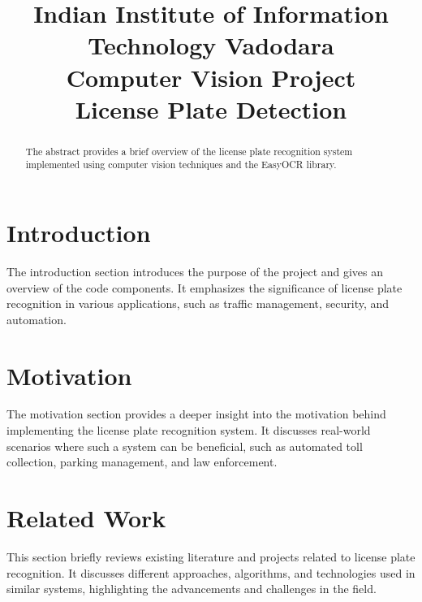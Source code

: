\documentclass[conference]{IEEEtran}
\begin{document}
\title{%
Indian Institute of Information Technology Vadodara\\[1\baselineskip]
Computer Vision Project\\[1\baselineskip]
License Plate Detection
}

\author{
\and
{}
\and
{}
\and
{}
}

\maketitle

\begin{abstract}
The abstract provides a brief overview of the license plate recognition system implemented using computer vision techniques and the EasyOCR library.
\end{abstract}

\section{Introduction}
The introduction section introduces the purpose of the project and gives an overview of the code components. It emphasizes the significance of license plate recognition in various applications, such as traffic management, security, and automation.

\section{Motivation}
The motivation section provides a deeper insight into the motivation behind implementing the license plate recognition system. It discusses real-world scenarios where such a system can be beneficial, such as automated toll collection, parking management, and law enforcement.

\section{Related Work}
This section briefly reviews existing literature and projects related to license plate recognition. It discusses different approaches, algorithms, and technologies used in similar systems, highlighting the advancements and challenges in the field.
\end{document}
